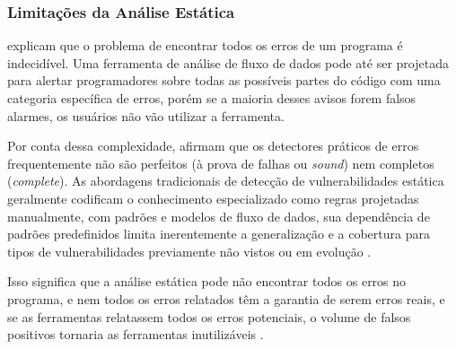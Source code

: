 \documentclass[
    12pt,                %
    openright,           %
    oneside,             %
    a4paper,             %
    english,             %
    brazil               %
]{abntex2}
\begin{document}
\subsubsection{Limitações da Análise Estática}
\label{sec:limitacoesanalise}
\par
{} explicam que o problema de encontrar todos os erros de um programa é indecidível.
Uma ferramenta de análise de fluxo de dados pode até ser projetada para alertar programadores sobre todas as possíveis partes do código com uma categoria específica de erros, porém se a maioria desses avisos forem falsos alarmes, os usuários não vão utilizar a ferramenta.
\par
Por conta dessa complexidade,  afirmam que os detectores práticos de erros frequentemente não são perfeitos (à prova de falhas ou \textit{sound}) nem completos (\textit{complete}).
As abordagens tradicionais de detecção de vulnerabilidades estática geralmente codificam o conhecimento especializado como regras projetadas manualmente, com padrões e modelos de fluxo de dados, sua dependência de padrões predefinidos limita inerentemente a generalização e a cobertura para tipos de vulnerabilidades previamente não vistos ou em evolução \cite{li2026llmbased}.
\par
Isso significa que a análise estática pode não encontrar todos os erros no programa, e nem todos os erros relatados têm a garantia de serem erros reais, e se as ferramentas relatassem todos os erros potenciais, o volume de falsos positivos tornaria as ferramentas inutilizáveis \cite{aho2007compilers}.
\end{document}
